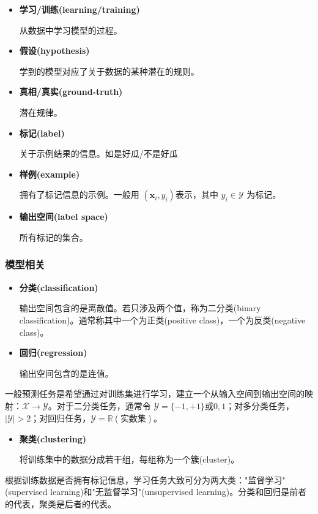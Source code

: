 \begin{itemize}
    \item \textbf{学习/训练(learning/training) }
    
    从数据中学习模型的过程。
    \item \textbf{假设(hypothesis)}
    
    学到的模型对应了关于数据的某种潜在的规则。
    \item \textbf{真相/真实(ground-truth)}
    
    潜在规律。
    \item \textbf{标记(label)}
    
    关于示例结果的信息。如是好瓜/不是好瓜
    \item \textbf{样例(example)}
    
    拥有了标记信息的示例。一般用 $(\bm{x}_i,y_i)$表示，其中 $y_i \in \mathcal{Y}$ 为标记。
    \item \textbf{输出空间(label space)}
    
    所有标记的集合。
\end{itemize}

\subsubsection{模型相关}

\begin{itemize}
    \item \textbf{分类(classification)}
    
    输出空间包含的是离散值。若只涉及两个值，称为二分类(binary classification)。通常称其中一个为正类(positive class)，一个为反类(negative class)。
    \item \textbf{ 回归(regression)}
    
    输出空间包含的是连值。
\end{itemize}

一般预测任务是希望通过对训练集进行学习，建立一个从输入空间到输出空间的映射：$\mathcal{X} \rightarrow \mathcal{Y}$。对于二分类任务，通常令 $\mathcal{Y} = \{-1,+1\} \text{或} {0,1}$；对多分类任务，$|\mathcal{Y}|>2$；对回归任务，$\mathcal{Y} = \mathbb{R}(\text{实数集})$。

\begin{itemize}
    \item \textbf{聚类(clustering)}
    
    将训练集中的数据分成若干组，每组称为一个簇(cluster)。
\end{itemize}

根据训练数据是否拥有标记信息，学习任务大致可分为两大类："监督学习"(supervised learning)和"无监督学习"(unsupervised learning)。分类和回归是前者的代表，聚类是后者的代表。

